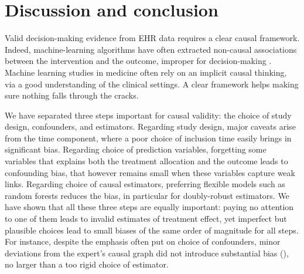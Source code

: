 \documentclass[10pt,letterpaper]{article}
\providecommand{\DIFdelbegin}{} %
\newcommand{\DIFscaledelfig}{0.5}
\newlength{\DIFdelgraphicswidth} %
\newlength{\DIFdelgraphicsheight} %
\newcommand{\DIFdelincludegraphics}[2][]{%
\sbox{\DIFdelgraphicsbox}{\DIFOincludegraphics[#1]{#2}}%
\settoboxwidth{\DIFdelgraphicswidth}{\DIFdelgraphicsbox} %
\settoboxtotalheight{\DIFdelgraphicsheight}{\DIFdelgraphicsbox} %
\scalebox{\DIFscaledelfig}{%
\parbox[b]{\DIFdelgraphicswidth}{\usebox{\DIFdelgraphicsbox}\\[-\baselineskip] \rule{\DIFdelgraphicswidth}{0em}}\llap{\resizebox{\DIFdelgraphicswidth}{\DIFdelgraphicsheight}{%
\setlength{\unitlength}{\DIFdelgraphicswidth}%
\begin{picture}(1,1)%
\thicklines\linethickness{2pt} %
{\color[rgb]{1,0,0}\put(0,0){\framebox(1,1){}}}%
{\color[rgb]{1,0,0}\put(0,0){\line( 1,1){1}}}%
{\color[rgb]{1,0,0}\put(0,1){\line(1,-1){1}}}%
\end{picture}%
}\hspace*{3pt}}} %
} %
\DeclareRobustCommand{\DIFdelbegin}{\DIFOdelbegin \let\includegraphics\DIFdelincludegraphics} %
\begin{document}
\section*{Discussion and conclusion}\label{sec:discussion}


Valid decision-making evidence from EHR data requires a clear causal framework.
Indeed, machine-learning algorithms have often extracted non-causal associations
between the intervention and the outcome, improper for decision-making
\cite{winkler2019association,badgeley2019deep,obermeyer2019dissecting}.
Machine learning studies in medicine often rely on an implicit causal
thinking, via a good understanding of the clinical settings.
A clear framework helps making
sure nothing falls through the cracks.

We have separated three steps important for causal validity: the choice
of study design, confounders, and estimators.
%
Regarding study design, major caveats arise from the time component,
where a poor choice of inclusion time easily brings in significant bias. Regarding choice of prediction
variables, forgetting some variables that explains both the treatment
allocation and the outcome leads to confounding bias, that however
remains small when these
variables capture weak links. Regarding choice of causal estimators,
preferring flexible models such as random forests reduces the bias, in
particular for doubly-robust estimators.
%
We have shown that all these three steps are equally important: paying no
attention to one of them leads to invalid estimates of treatment effect,
yet imperfect but plausible choices lead to small biases of the same
order of magnitude for all steps.
%
For instance, despite the emphasis often put on choice of confounders,
minor deviations from the expert's causal graph did not introduce
substantial bias (), no larger than a too
rigid choice of estimator.
\DIFdelbegin %
\end{document}
